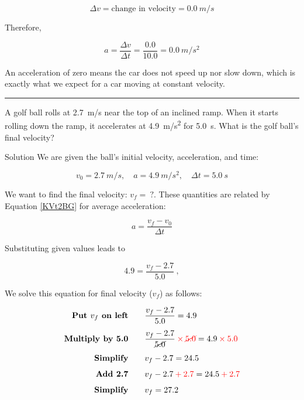 \documentclass[dvipsnames]{article}
\begin{document}
\begin{equation*}
    \Delta{v} = \text{change in velocity} = \SI{0.0}{m/s}
\end{equation*}

Therefore,

\begin{equation*}
    a = \frac{\Delta{v}}{\Delta{t}} = \frac{0.0}{10.0} = \SI{0.0}{m/s^2}
\end{equation*}

An acceleration of zero means the car does not speed up nor slow down, which is exactly what we expect for a car moving at constant velocity.

\hrule


\begin{example}
    A golf ball rolls at \SI{2.7}{m/s} near the top of an inclined ramp. When it starts rolling down the ramp, it accelerates at \SI{4.9}{m/s^2} for \SI{5.0}{s}. What is the golf ball's final velocity?
\end{example}

Solution We are given the ball's initial velocity, acceleration, and time:

\begin{equation*}
    v_0 = \SI{2.7}{m/s}, \quad
    a = \SI{4.9}{m/s^2}, \quad
    \Delta{t} = \SI{5.0}{s}
\end{equation*}

We want to find the final velocity: $v_f =\ ?$. These quantities are related by Equation \ref{KVt2BG} for average acceleration:

\begin{equation*}
    a = \frac{v_f - v_0}{\Delta{t}}
\end{equation*}

Substituting given values leads to

\begin{equation*}
    4.9 = \frac{v_f - 2.7}{5.0}\ ,
\end{equation*}

We solve this equation for final velocity ($v_f$) as follows:

\begin{align*}
    \textbf{Put $v_f$ on left} \qquad & \frac{v_f - 2.7}{5.0} = 4.9\\[1ex]
    \textbf{Multiply by 5.0} \qquad & \frac{v_f - 2.7}{\cancel{5.0}} \mathbin{\color{red}\times} \textcolor{red}{\cancel{5.0}} = 4.9 \mathbin{\color{red}\times} \textcolor{red}{5.0}\\[1ex] 
    \textbf{Simplify} \qquad & v_f - 2.7 = 24.5\\[1ex]
    \textbf{Add 2.7} \qquad & v_f - 2.7 \mathbin{\color{red} +} \textcolor{red}{2.7} = 24.5 \mathbin{\color{red} +} \textcolor{red}{2.7}\\[1ex]
    \textbf{Simplify} \qquad & v_f = 27.2
\end{align*}
\end{document}
